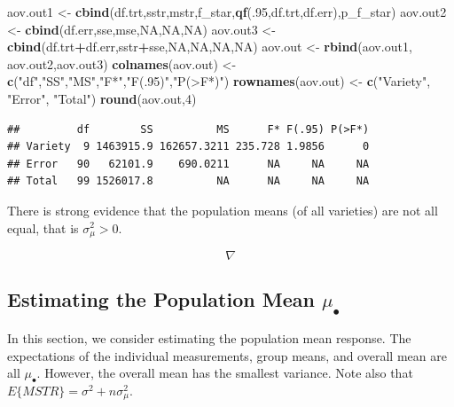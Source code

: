 \documentclass[
]{book}
\newenvironment{Shaded}{\begin{snugshade}}{\end{snugshade}}
\newcommand{\ConstantTok}[1]{\textcolor[rgb]{0.56,0.35,0.01}{#1}}
\newcommand{\DecValTok}[1]{\textcolor[rgb]{0.00,0.00,0.81}{#1}}
\newcommand{\FunctionTok}[1]{\textcolor[rgb]{0.13,0.29,0.53}{\textbf{#1}}}
\newcommand{\NormalTok}[1]{#1}
\newcommand{\OtherTok}[1]{\textcolor[rgb]{0.56,0.35,0.01}{#1}}
\newcommand{\SpecialCharTok}[1]{\textcolor[rgb]{0.81,0.36,0.00}{\textbf{#1}}}
\newcommand{\StringTok}[1]{\textcolor[rgb]{0.31,0.60,0.02}{#1}}
\begin{document}
\begin{Shaded}
\begin{Highlighting}[]
\NormalTok{aov.out1 }\OtherTok{\textless{}{-}} \FunctionTok{cbind}\NormalTok{(df.trt,sstr,mstr,f\_star,}\FunctionTok{qf}\NormalTok{(.}\DecValTok{95}\NormalTok{,df.trt,df.err),p\_f\_star)}
\NormalTok{aov.out2 }\OtherTok{\textless{}{-}} \FunctionTok{cbind}\NormalTok{(df.err,sse,mse,}\ConstantTok{NA}\NormalTok{,}\ConstantTok{NA}\NormalTok{,}\ConstantTok{NA}\NormalTok{)}
\NormalTok{aov.out3 }\OtherTok{\textless{}{-}} \FunctionTok{cbind}\NormalTok{(df.trt}\SpecialCharTok{+}\NormalTok{df.err,sstr}\SpecialCharTok{+}\NormalTok{sse,}\ConstantTok{NA}\NormalTok{,}\ConstantTok{NA}\NormalTok{,}\ConstantTok{NA}\NormalTok{,}\ConstantTok{NA}\NormalTok{)}
\NormalTok{aov.out }\OtherTok{\textless{}{-}} \FunctionTok{rbind}\NormalTok{(aov.out1, aov.out2,aov.out3)}
\FunctionTok{colnames}\NormalTok{(aov.out) }\OtherTok{\textless{}{-}} \FunctionTok{c}\NormalTok{(}\StringTok{"df"}\NormalTok{,}\StringTok{"SS"}\NormalTok{,}\StringTok{"MS"}\NormalTok{,}\StringTok{"F*"}\NormalTok{,}\StringTok{"F(.95)"}\NormalTok{,}\StringTok{"P(\textgreater{}F*)"}\NormalTok{)}
\FunctionTok{rownames}\NormalTok{(aov.out) }\OtherTok{\textless{}{-}} \FunctionTok{c}\NormalTok{(}\StringTok{"Variety"}\NormalTok{, }\StringTok{"Error"}\NormalTok{, }\StringTok{"Total"}\NormalTok{)}
\FunctionTok{round}\NormalTok{(aov.out,}\DecValTok{4}\NormalTok{)}
\end{Highlighting}
\end{Shaded}

\begin{verbatim}
##         df        SS          MS      F* F(.95) P(>F*)
## Variety  9 1463915.9 162657.3211 235.728 1.9856      0
## Error   90   62101.9    690.0211      NA     NA     NA
## Total   99 1526017.8          NA      NA     NA     NA
\end{verbatim}

There is strong evidence that the population means (of all varieties)
are not all equal, that is \(\sigma_{\mu}^2 > 0\).

\[\nabla \]

\subsection{\texorpdfstring{Estimating the Population Mean
\(\mu_{\bullet}\)}{Estimating the Population Mean \textbackslash mu\_\{\textbackslash bullet\}}}\label{estimating-the-population-mean-mu_bullet}

In this section, we consider estimating the population mean response.
The expectations of the individual measurements, group means, and
overall mean are all \(\mu_{\bullet}\). However, the overall mean has
the smallest variance. Note also that
\(E\{MSTR\}=\sigma^2+n\sigma_{\mu}^2\).
\end{document}
